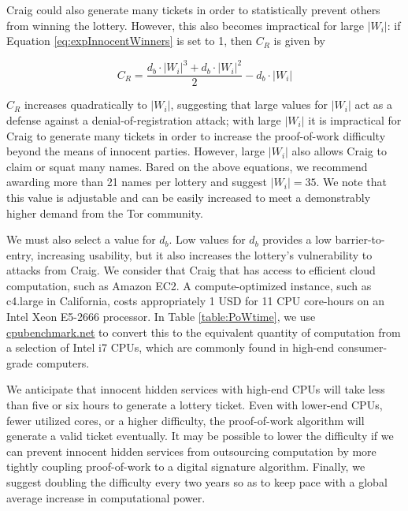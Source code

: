 \documentclass[USenglish,oneside,twocolumn]{article}
\newcommand*\nWinners{\left\vert{W_{i}}\right\vert}
\begin{document}
Craig could also generate many tickets in order to statistically prevent others from winning the lottery. However, this also becomes impractical for large $ \nWinners $: if Equation \ref{eq:expInnocentWinners} is set to 1, then $ C_{R} $ is given by 

\begin{equation}
	C_{R} = \frac{d_{b} \cdot \nWinners^{3} + d_{b} \cdot \nWinners^{2}}{2} - d_{b} \cdot \nWinners
	\label{eq:resistance2DoR}
\end{equation}

$ C_{R} $ increases quadratically to $ \nWinners $, suggesting that large values for $ \nWinners $ act as a defense against a denial-of-registration attack; with large $ \nWinners $ it is impractical for Craig to generate many tickets in order to increase the proof-of-work difficulty beyond the means of innocent parties. However, large $ \nWinners $ also allows Craig to claim or squat many names. Bared on the above equations, we recommend awarding more than 21 names per lottery and suggest $ \nWinners = 35 $. We note that this value is adjustable and can be easily increased to meet a demonstrably higher demand from the Tor community.

We must also select a value for $ d_{b} $. Low values for $ d_{b} $ provides a low barrier-to-entry, increasing usability, but it also increases the lottery's vulnerability to attacks from Craig. We consider that Craig that has access to efficient cloud computation, such as Amazon EC2. A compute-optimized instance, such as c4.large in California, costs appropriately 1 USD for 11 CPU core-hours on an Intel Xeon E5-2666 processor. In Table \ref{table:PoWtime}, we use \href{https://www.cpubenchmark.net/}{cpubenchmark.net} to convert this to the equivalent quantity of computation from a selection of Intel i7 CPUs, which are commonly found in high-end consumer-grade computers.


We anticipate that innocent hidden services with high-end CPUs will take less than five or six hours to generate a lottery ticket. Even with lower-end CPUs, fewer utilized cores, or a higher difficulty, the proof-of-work algorithm will generate a valid ticket eventually. It may be possible to lower the difficulty if we can prevent innocent hidden services from outsourcing computation by more tightly coupling proof-of-work to a digital signature algorithm. Finally, we suggest doubling the difficulty every two years so as to keep pace with a global average increase in computational power.
\end{document}
